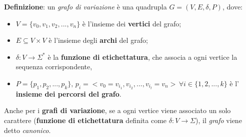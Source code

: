     \vspace{20pt}
    \textbf{Definizione}: un \emph{grafo di variazione} è una quadrupla $G = (V, E, \delta, P)$, dove:
    \begin{itemize}
        \item $V = \{v_0, v_1, v_2, ..., v_n\}$ è l'insieme dei \textbf{vertici} del grafo;
        \item  $E \subseteq V \times V$ è l'insieme degli \textbf{archi} del grafo;
        \item $\delta: V \rightarrow \Sigma^*$ è la \textbf{funzione di etichettatura}, che associa a ogni vertice la sequenza corrispondente, 
        \item $P = \{p_1, p_2, ..., p_k\}, \, p_i = <v_0 = v_{i_1}, v_{i_2}, ..., v_{i_l} = v_n> \, \forall i \in \{1, 2, ..., k\}$ è l' \textbf{insieme dei percorsi del grafo}. 
    \end{itemize}
    Anche per i \textbf{grafi di variazione}, se a ogni vertice viene associato un solo carattere (\textbf{funzione di etichettatura} definita come $\delta : V \rightarrow \Sigma$), il \emph{grafo} viene detto \emph{canonico}.
\clearpage
